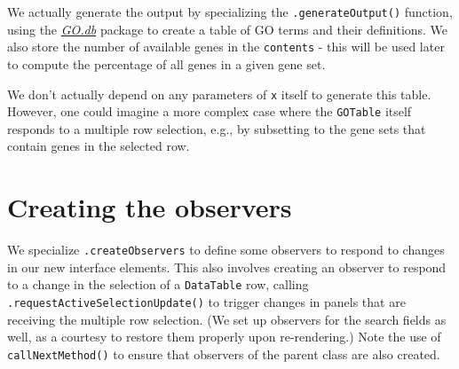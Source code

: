 \documentclass[]{book}
\newenvironment{Shaded}{\begin{snugshade}}{\end{snugshade}}
\newcommand{\KeywordTok}[1]{\textcolor[rgb]{0.13,0.29,0.53}{\textbf{#1}}}
\newcommand{\DataTypeTok}[1]{\textcolor[rgb]{0.13,0.29,0.53}{#1}}
\newcommand{\StringTok}[1]{\textcolor[rgb]{0.31,0.60,0.02}{#1}}
\newcommand{\ControlFlowTok}[1]{\textcolor[rgb]{0.13,0.29,0.53}{\textbf{#1}}}
\newcommand{\OperatorTok}[1]{\textcolor[rgb]{0.81,0.36,0.00}{\textbf{#1}}}
\newcommand{\NormalTok}[1]{#1}
\begin{document}
We actually generate the output by specializing the
\texttt{.generateOutput()} function, using the
\emph{\href{https://bioconductor.org/packages/3.11/GO.db}{GO.db}}
package to create a table of GO terms and their definitions. We also
store the number of available genes in the \texttt{contents} - this will
be used later to compute the percentage of all genes in a given gene
set.

\begin{Shaded}
\end{Shaded}

We don't actually depend on any parameters of \texttt{x} itself to
generate this table. However, one could imagine a more complex case
where the \texttt{GOTable} itself responds to a multiple row selection,
e.g., by subsetting to the gene sets that contain genes in the selected
row.

\section{Creating the observers}\label{creating-the-observers-3}

We specialize \texttt{.createObservers} to define some observers to
respond to changes in our new interface elements. This also involves
creating an observer to respond to a change in the selection of a
\texttt{DataTable} row, calling \texttt{.requestActiveSelectionUpdate()}
to trigger changes in panels that are receiving the multiple row
selection. (We set up observers for the search fields as well, as a
courtesy to restore them properly upon re-rendering.) Note the use of
\texttt{callNextMethod()} to ensure that observers of the parent class
are also created.
\end{document}
